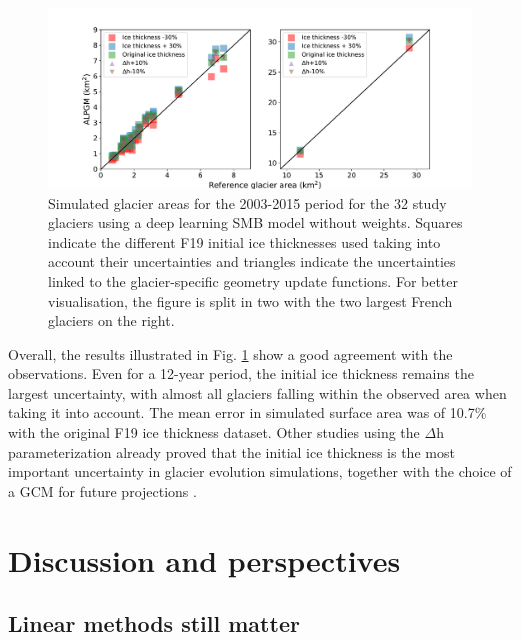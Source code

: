 \begin{figure}[h]
\centering
\includegraphics[width=15cm]{Figures/methods/Figure_11.pdf}
\caption{Simulated glacier areas for the 2003-2015 period for the 32 study glaciers using a deep learning SMB model without weights. Squares indicate the different F19 initial ice thicknesses used taking into account their uncertainties and triangles indicate the uncertainties linked to the glacier-specific geometry update functions. For better visualisation, the figure is split in two with the two largest French glaciers on the right.}
\label{methods:fig11}
\end{figure}

Overall, the results illustrated in Fig. \ref{methods:fig11} show a good agreement with the observations. Even for a 12-year period, the initial ice thickness remains the largest uncertainty, with almost all glaciers falling within the observed area when taking it into account. The mean error in simulated surface area was of 10.7\% with the original F19 ice thickness dataset. Other studies using the $\Delta$h parameterization already proved that the initial ice thickness is the most important uncertainty in glacier evolution simulations, together with the choice of a GCM for future projections \citep{huss_new_2015}. 

\section{Discussion and perspectives} \label{methods:discussion}

\subsection{Linear methods still matter} \label{methods:discussion:linear}

